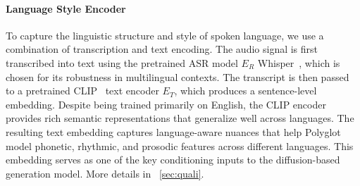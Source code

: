 \documentclass[a4paper, 10pt, conference]{ieeeconf}      %
\begin{document}
\paragraph{Language Style Encoder}  
To capture the linguistic structure and style of spoken language, we use a combination of transcription and text encoding. The audio signal is first transcribed into text using the pretrained ASR model \(E_R\) Whisper~\cite{radford2021learningtransferablevisualmodels}, which is chosen for its robustness in multilingual contexts. The transcript is then passed to a pretrained 
CLIP~\cite{clip} text encoder \(E_T\), which produces a sentence-level embedding.  
Despite being trained primarily on English, the CLIP encoder provides rich semantic representations that generalize well across languages. The resulting text embedding captures language-aware nuances that help Polyglot model phonetic, rhythmic, and prosodic features across different languages. This embedding serves as one of the key conditioning inputs to the diffusion-based generation model. More details in ~\ref{sec:quali}.
\end{document}
